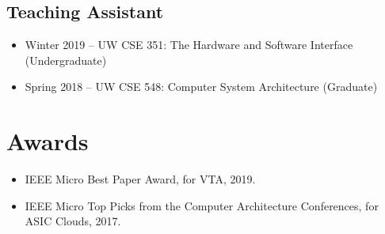 \documentclass[10pt]{article}
\begin{document}
\subsection*{Teaching Assistant}

\begin{itemize}
  \item Winter 2019 -- UW CSE 351: The Hardware and Software Interface (Undergraduate)
  \item Spring 2018 -- UW CSE 548: Computer System Architecture (Graduate)
\end{itemize}

\section*{Awards}

\begin{itemize}
  \item IEEE Micro Best Paper Award, for VTA, 2019.
  \item IEEE Micro Top Picks from the Computer Architecture Conferences, for ASIC Clouds, 2017.
\end{itemize}
\end{document}
